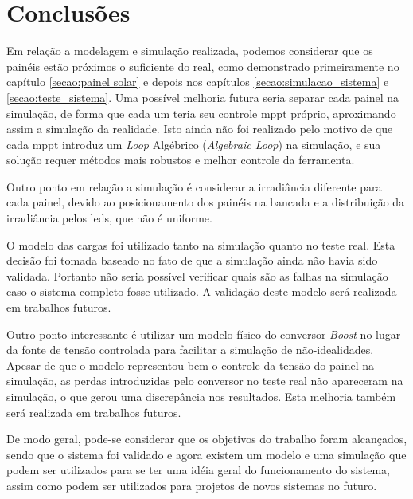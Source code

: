 \chapter{Conclusões} \label{secao:conclusoes}

Em relação a modelagem e simulação realizada, podemos considerar que os painéis estão próximos o suficiente do real, como demonstrado primeiramente no capítulo \ref{secao:painel solar} e depois nos capítulos \ref{secao:simulacao_sistema} e \ref{secao:teste_sistema}. Uma possível melhoria futura seria separar cada painel na simulação, de forma que cada um teria seu controle \gls{mppt} próprio, aproximando assim a simulação da realidade. Isto ainda não foi realizado pelo motivo de que cada \gls{mppt} introduz um \textit{Loop} Algébrico (\textit{Algebraic Loop}) na simulação, e sua solução requer métodos mais robustos e melhor controle da ferramenta.

Outro ponto em relação a simulação é considerar a irradiância diferente para cada painel, devido ao posicionamento dos painéis na bancada e a distribuição da irradiância pelos leds, que não é uniforme.

O modelo das cargas foi utilizado tanto na simulação quanto no teste real. Esta decisão foi tomada baseado no fato de que a simulação ainda não havia sido validada. Portanto não seria possível verificar quais são as falhas na simulação caso o sistema completo fosse utilizado. A validação deste modelo será realizada em trabalhos futuros.

Outro ponto interessante é utilizar um modelo físico do conversor \textit{Boost} no lugar da fonte de tensão controlada para facilitar a simulação de não-idealidades. Apesar de que o modelo representou bem o controle da tensão do painel na simulação, as perdas introduzidas pelo conversor no teste real não apareceram na simulação, o que gerou uma discrepância nos resultados. Esta melhoria também será realizada em trabalhos futuros.

De modo geral, pode-se considerar que os objetivos do trabalho foram alcançados, sendo que o sistema foi validado e agora existem um modelo e uma simulação que podem ser utilizados para se ter uma idéia geral do funcionamento do sistema, assim como podem ser utilizados para projetos de novos sistemas no futuro.